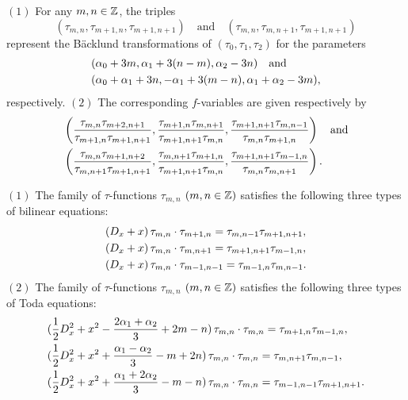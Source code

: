 \begin{prop}\label{Prop41}
$(1)$ 
For any $m,n\in{\Bbb Z}$, 
the triples 
\begin{equation}\label{twotriples}
(\tau_{m,n},\tau_{m+1,n},\tau_{m+1,n+1})\quad\mbox{and}\quad
(\tau_{m,n},\tau_{m,n+1},\tau_{m+1,n+1})
\end{equation}
 represent the B\"acklund transformations of $(\tau_0,\tau_1,\tau_2)$ for the 
parameters 
\begin{equation}
\begin{align}
&(\alpha_0+3m,\alpha_1+3(n-m),\alpha_2-3n)\quad \mbox{and }\\
&(\alpha_0+\alpha_1+3n,-\alpha_1+3(m-n),\alpha_1+\alpha_2-3m),\notag
\end{align}
\end{equation}
respectively. 
\newline
$(2)$ The corresponding $f$-variables are given respectively by
\begin{equation}
\begin{align}
&\left(\frac{\tau_{m,n}\tau_{m+2,n+1}}{\tau_{m+1,n}\tau_{m+1,n+1}},
\frac{\tau_{m+1,n}\tau_{m,n+1}}{\tau_{m+1,n+1}\tau_{m,n}}, 
\frac{\tau_{m+1,n+1}\tau_{m,n-1}}{\tau_{m,n}\tau_{m+1,n}}
\right)\quad\mbox{and}\\
&\left(\frac{\tau_{m,n}\tau_{m+1,n+2}}{\tau_{m,n+1}\tau_{m+1,n+1}},
\frac{\tau_{m,n+1}\tau_{m+1,n}}{\tau_{m+1,n+1}\tau_{m,n}},
\frac{\tau_{m+1,n+1}\tau_{m-1,n}}{\tau_{m,n}\tau_{m,n+1}}
\right).\notag
\end{align}
\end{equation}
\end{prop}
\begin{prop}\label{Prop41b}
$(1)$ The family of $\tau$-functions $\tau_{m,n}$ $(m,n\in {\Bbb Z})$  
satisfies the following three types of bilinear equations: 
\begin{equation}
\begin{align}
&(D_x+x)\, 
\tau_{m,n}\cdot\tau_{m+1,n}=\tau_{m,n-1}\tau_{m+1,n+1},\notag\\
&(D_x+x)\, 
\tau_{m,n}\cdot\tau_{m,n+1}=\tau_{m+1,n+1}\tau_{m-1,n},\\
&(D_x+x)\, 
\tau_{m,n}\cdot\tau_{m-1,n-1}=\tau_{m-1,n}\tau_{m,n-1}.\notag
\end{align}
\end{equation}
$(2)$ The family of $\tau$-functions $\tau_{m,n}$ $(m,n\in {\Bbb Z})$  
satisfies the following three types of Toda equations: 
\begin{equation}
\begin{align}
&(\frac{1}{2}D_x^2+x^2-\frac{2\alpha_1+\alpha_2}{3}+2m-n)\, 
\tau_{m,n}\cdot\tau_{m,n}=\tau_{m+1,n}\tau_{m-1,n},\notag\\
&(\frac{1}{2}D_x^2+x^2+\frac{\alpha_1-\alpha_2}{3}-m+2n)\, 
\tau_{m,n}\cdot\tau_{m,n}=\tau_{m,n+1}\tau_{m,n-1},\\
&(\frac{1}{2}D_x^2+x^2+\frac{\alpha_1+2\alpha_2}{3}-m-n)\, 
\tau_{m,n}\cdot\tau_{m,n}=\tau_{m-1,n-1}\tau_{m+1,n+1}.\notag
\end{align}
\end{equation}
\end{prop}
